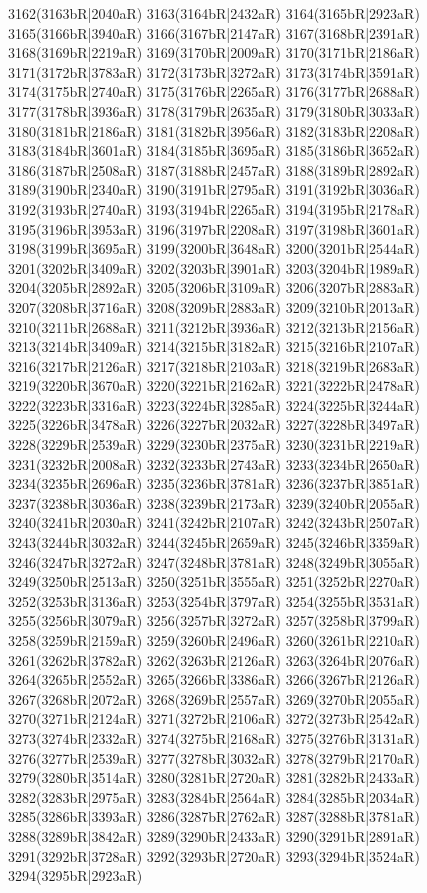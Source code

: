 3162(3163bR|2040aR) 3163(3164bR|2432aR) 3164(3165bR|2923aR) 3165(3166bR|3940aR) 3166(3167bR|2147aR) 3167(3168bR|2391aR) \\3168(3169bR|2219aR) 3169(3170bR|2009aR) 3170(3171bR|2186aR) 3171(3172bR|3783aR) 3172(3173bR|3272aR) 3173(3174bR|3591aR) 3174(3175bR|2740aR) 3175(3176bR|2265aR) 3176(3177bR|2688aR) \\3177(3178bR|3936aR) 3178(3179bR|2635aR) 3179(3180bR|3033aR) 3180(3181bR|2186aR) 3181(3182bR|3956aR) 3182(3183bR|2208aR) 3183(3184bR|3601aR) 3184(3185bR|3695aR) 3185(3186bR|3652aR) \\3186(3187bR|2508aR) 3187(3188bR|2457aR) 3188(3189bR|2892aR) 3189(3190bR|2340aR) 3190(3191bR|2795aR) 3191(3192bR|3036aR) 3192(3193bR|2740aR) 3193(3194bR|2265aR) 3194(3195bR|2178aR) \\3195(3196bR|3953aR) 3196(3197bR|2208aR) 3197(3198bR|3601aR) 3198(3199bR|3695aR) 3199(3200bR|3648aR) 3200(3201bR|2544aR) 3201(3202bR|3409aR) 3202(3203bR|3901aR) 3203(3204bR|1989aR) \\3204(3205bR|2892aR) 3205(3206bR|3109aR) 3206(3207bR|2883aR) 3207(3208bR|3716aR) 3208(3209bR|2883aR) 3209(3210bR|2013aR) 3210(3211bR|2688aR) 3211(3212bR|3936aR) 3212(3213bR|2156aR) \\3213(3214bR|3409aR) 3214(3215bR|3182aR) 3215(3216bR|2107aR) 3216(3217bR|2126aR) 3217(3218bR|2103aR) 3218(3219bR|2683aR) 3219(3220bR|3670aR) 3220(3221bR|2162aR) 3221(3222bR|2478aR) \\3222(3223bR|3316aR) 3223(3224bR|3285aR) 3224(3225bR|3244aR) 3225(3226bR|3478aR) 3226(3227bR|2032aR) 3227(3228bR|3497aR) 3228(3229bR|2539aR) 3229(3230bR|2375aR) 3230(3231bR|2219aR) \\3231(3232bR|2008aR) 3232(3233bR|2743aR) 3233(3234bR|2650aR) 3234(3235bR|2696aR) 3235(3236bR|3781aR) 3236(3237bR|3851aR) 3237(3238bR|3036aR) 3238(3239bR|2173aR) 3239(3240bR|2055aR) \\3240(3241bR|2030aR) 3241(3242bR|2107aR) 3242(3243bR|2507aR) 3243(3244bR|3032aR) 3244(3245bR|2659aR) 3245(3246bR|3359aR) 3246(3247bR|3272aR) 3247(3248bR|3781aR) 3248(3249bR|3055aR) \\3249(3250bR|2513aR) 3250(3251bR|3555aR) 3251(3252bR|2270aR) 3252(3253bR|3136aR) 3253(3254bR|3797aR) 3254(3255bR|3531aR) 3255(3256bR|3079aR) 3256(3257bR|3272aR) 3257(3258bR|3799aR) \\3258(3259bR|2159aR) 3259(3260bR|2496aR) 3260(3261bR|2210aR) 3261(3262bR|3782aR) 3262(3263bR|2126aR) 3263(3264bR|2076aR) 3264(3265bR|2552aR) 3265(3266bR|3386aR) 3266(3267bR|2126aR) \\3267(3268bR|2072aR) 3268(3269bR|2557aR) 3269(3270bR|2055aR) 3270(3271bR|2124aR) 3271(3272bR|2106aR) 3272(3273bR|2542aR) 3273(3274bR|2332aR) 3274(3275bR|2168aR) 3275(3276bR|3131aR) \\3276(3277bR|2539aR) 3277(3278bR|3032aR) 3278(3279bR|2170aR) 3279(3280bR|3514aR) 3280(3281bR|2720aR) 3281(3282bR|2433aR) 3282(3283bR|2975aR) 3283(3284bR|2564aR) 3284(3285bR|2034aR) \\3285(3286bR|3393aR) 3286(3287bR|2762aR) 3287(3288bR|3781aR) 3288(3289bR|3842aR) 3289(3290bR|2433aR) 3290(3291bR|2891aR) 3291(3292bR|3728aR) 3292(3293bR|2720aR) 3293(3294bR|3524aR) \\3294(3295bR|2923aR) 
